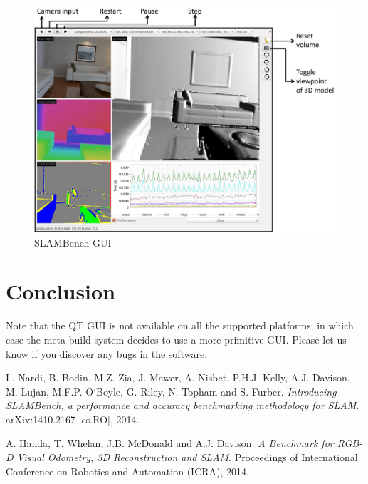 \documentclass[12pt]{article}
\begin{document}
\begin{figure}
    \includegraphics[width=7.0in]{SLAMBench_GUI.pdf}
    \caption{SLAMBench GUI}
    \label{gui}
\end{figure}

\section{Conclusion}
Note that the QT GUI is not available on all the supported platforms; in which case the meta build system decides to use a more primitive GUI. Please let us know if you discover any bugs in the software.

\begin{thebibliography}{9}
  L. Nardi, B. Bodin, M.Z. Zia, J. Mawer, A. Nisbet, P.H.J. Kelly, A.J. Davison, M. Lujan, M.F.P. O`Boyle, G. Riley, N. Topham and S. Furber.
  \emph{Introducing {SLAMBench}, a performance and accuracy benchmarking methodology for {SLAM}}.
  	arXiv:1410.2167 [cs.RO],
  2014.

  A. Handa, T. Whelan, J.B. McDonald and A.J. Davison.
  \emph{A Benchmark for {RGB-D} Visual Odometry, {3D} Reconstruction and {SLAM}}.
  Proceedings of International Conference on Robotics and Automation (ICRA),
  2014.

\end{thebibliography}
\end{document}
